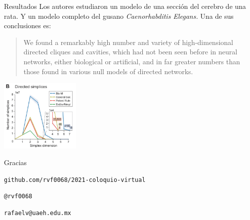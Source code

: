 \documentclass[spanish, presentation, aspectratio=169]{beamer}
\begin{document}
\begin{frame}[label={sec:org7ab3c63}]{Resultados}
Los autores estudiaron un modelo de una sección del cerebro de una rata. Y un modelo completo del gusano \emph{Caenorhabditis Elegans.} Una de sus conclusiones es:

\medskip

\begin{quote}
We found a remarkably high number and variety of high-dimensional directed cliques and cavities, which had not been seen before in neural networks, either biological or artificial, and in far greater numbers than those found in various null models of directed networks.
\end{quote}

\pause

\begin{center}
\includegraphics[height=3.5cm]{muchossimplejos.png}
\end{center}
\end{frame}

\begin{frame}
   \begin{center}
   \begin{huge}
   Gracias
   \end{huge}

  \bigskip
  \bigskip

  \begin{large}
  \faGithub{} \texttt{github.com/rvf0068/2021-coloquio-virtual}

   \bigskip

  \faTwitter{} \texttt{@rvf0068}

   \bigskip

   \faEnvelope{} \texttt{rafaelv@uaeh.edu.mx}

  \end{large}
  \end{center}
\end{frame}
\end{document}
